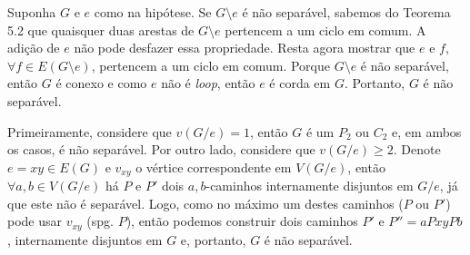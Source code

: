 
 Suponha $G$ e $e$ como na hipótese. Se $G\setminus e$ é não
separável, sabemos do Teorema 5.2 que quaisquer duas arestas de $G\setminus e$
pertencem a um ciclo em comum. A adição de $e$ não pode desfazer essa
propriedade. Resta agora mostrar que $e$ e $f$, $\forall f \in E(G\setminus
e)$, pertencem a um ciclo em comum.  Porque $G\setminus e$ é não separável,
então $G$ é conexo e como $e$ não é \emph{loop}, então $e$ é corda em $G$.
Portanto, $G$ é não separável.

 Primeiramente, considere que $v(G/e) = 1$, então  $G$ é um $P_2$
ou $C_2$ e, em ambos os casos, é não separável. Por outro lado, considere que
$v(G/e) \ge 2$. Denote $e = xy \in E(G)$ e $v_{xy}$ o vértice correspondente
em $V(G/e)$, então $\forall a,b \in V(G/e)$ há $P$ e $P'$ dois $a,b$-caminhos
internamente disjuntos em $G/e$, já que este não é separável. Logo, como no 
máximo um destes caminhos ($P$ ou $P'$) pode usar $v_{xy}$ (spg. $P$), então
podemos construir dois caminhos $P'$ e $P'' = aPxyPb$, internamente disjuntos
em $G$ e, portanto, $G$ é não separável.
\fimprova
